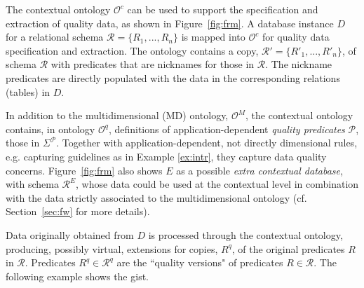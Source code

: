 \documentclass[format=acmsmall, review=false, screen=true]{acmart}
\newcommand{\mc}[1]{\mathcal{ #1}}
\newcommand{\schema}{\mc{R}}
\newcommand{\red}[1]{{#1}}
\newcommand{\blue}[1]{{#1}}
\begin{document}
The contextual ontology $\mc{O}^c$ can be used to support the specification and extraction of quality data,  as shown in Figure~\ref{fig:frm}.  A database instance $D$ for a relational schema $\schema=\{R_1,...,R_n\}$ is mapped into $\mc{O}^c$ for quality data specification and extraction. The ontology contains a copy,  $\schema'=\{R'_1,...,R'_n\}$, of schema $\schema$ with predicates that are nicknames  for those in $\schema$. The nickname predicates are directly populated with the data in the corresponding relations (tables) in $D$.

In addition to the multidimensional (MD) ontology, $\mc{O}^M$, the contextual ontology contains, in ontology $\mc{O}^q$, definitions of application-dependent {\em quality predicates} $\mc{P}$, those in $\Sigma^\mc{P}$. Together with application-dependent, not directly dimensional rules, e.g. capturing  guidelines as in Example \ref{ex:intr}, they  capture data quality concerns. \red{Figure~\ref{fig:frm} also shows $E$ as a possible {\em extra contextual database}, with schema $\mc{R}^E$, whose data could be used at the contextual level in combination with the data strictly associated to the multidimensional ontology (cf. Section~\ref{sec:fw} for more details).}

Data originally
obtained from $D$ is processed through the contextual ontology, producing, possibly virtual, extensions for copies, $R^q$, of the original predicates $R$ in $\schema$. Predicates $R^q \in \schema^q$ are the ``quality versions" of predicates $R \in \schema$.  The following example shows the gist. %
\end{document}
